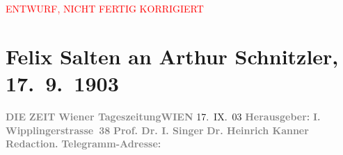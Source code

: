 
\begin{center}
            \textcolor{red}{ENTWURF, NICHT FERTIG KORRIGIERT}
                      \end{center}
            
         
         \renewcommand{\erwaehntePersonen}{Personen: Heinrich Kanner, Ottilie Salten, Olga Schnitzler, Heinrich Schnitzler, Isidor Singer}
         \renewcommand{\erwaehnteInstitutionen}{Institutionen: Die Zeit}
         \renewcommand{\erwaehnteOrte}{Orte: Edmund-Weiß-Gasse, Frankgasse, Wien, Wipplingerstraße}
         \renewcommand{\erwaehnteWerke}{}
               \section[Felix Salten an Arthur Schnitzler, 17. 9. 1903]{ Felix Salten an Arthur Schnitzler, 17. 9. 1903}\nopagebreak{}\rehead{ }\begin{ledgroupsized}[t]{13cm}\normalsize\beginnumbering \toendnotes[C]{\smallbreak\pagebreak[2]} 
\toendnotes[C]{\smallbreak}\pstart
           \noindent{}{\pb}\textcolor{gray}{\textbf{DIE}}\pend
           \pstart
           \textcolor{gray}{\textbf{ZEIT}}\pend
           \pstart
           \textcolor{gray}{\textbf{Wiener Tageszeitung}}\hfill \textcolor{gray}{\textbf{WIEN}}{ }17. IX. 03\pend
           \pstart
           \textcolor{gray}{\textbf{Herausgeber: }}\hfill \textcolor{gray}{\textbf{I. Wipplingerstrasse 38}}\pend
           \pstart
           \textcolor{gray}{\textbf{Prof. Dr. I. Singer}}\pend
           \pstart
           \textcolor{gray}{\textbf{Dr. Heinrich Kanner}}\pend
           \pstart
           \textcolor{gray}{\textbf{Redaction.}}\pend
           \pstart
           \textcolor{gray}{\textbf{Telegramm-Adresse: \so{,{ }}}}\pend

\end{ledgroupsized}
